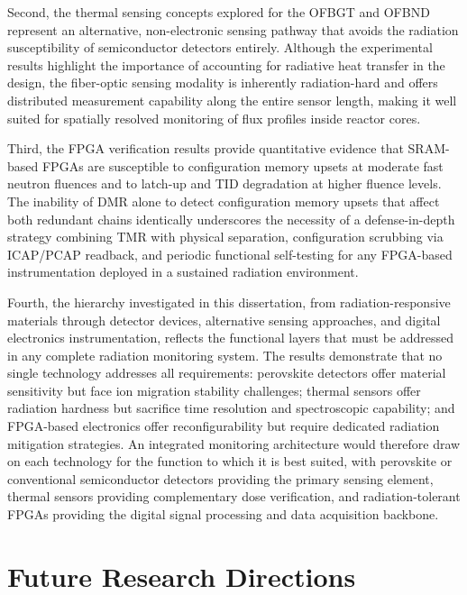 Second, the thermal sensing concepts explored for the OFBGT and OFBND
represent an alternative, non-electronic sensing pathway that avoids
the radiation susceptibility of semiconductor detectors entirely.
Although the experimental results highlight the importance of
accounting for radiative heat transfer in the design, the
fiber-optic sensing modality is inherently radiation-hard and offers
distributed measurement capability along the entire sensor length,
making it well suited for spatially resolved monitoring of flux
profiles inside reactor cores.

Third, the FPGA verification results provide quantitative evidence
that SRAM-based FPGAs are susceptible to configuration memory upsets
at moderate fast neutron fluences and to latch-up and TID degradation
at higher fluence levels.  The inability of DMR alone to detect
configuration memory upsets that affect both redundant chains
identically underscores the necessity of a defense-in-depth strategy
combining TMR with physical separation, configuration scrubbing via
ICAP/PCAP readback, and periodic functional self-testing for any
FPGA-based instrumentation deployed in a sustained radiation
environment.

Fourth, the hierarchy investigated in this dissertation, from
radiation-responsive materials through detector devices, alternative
sensing approaches, and digital electronics
instrumentation, reflects the functional layers that must be
addressed in any complete radiation monitoring system.  The results
demonstrate that no single technology addresses all requirements:
perovskite detectors offer material sensitivity but face ion migration
stability challenges; thermal sensors offer radiation hardness but
sacrifice time resolution and spectroscopic capability; and FPGA-based
electronics offer reconfigurability but require dedicated radiation
mitigation strategies.  An integrated monitoring architecture would
therefore draw on each technology for the function to which it is best
suited, with perovskite or conventional semiconductor detectors
providing the primary sensing element, thermal sensors providing
complementary dose verification, and radiation-tolerant FPGAs
providing the digital signal processing and data acquisition backbone.


\section{Future Research Directions}
\label{sec:conc_future}

